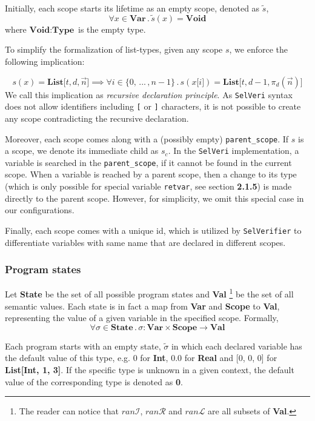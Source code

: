 \documentclass{article}
\begin{document}
Initially, each scope starts its lifetime as an empty scope, denoted as $\tilde{s}$, 
\[
\forall x \in \textbf{Var} \, . \,\tilde{s}(x) = \textbf{Void}
\]
where $\textbf{Void} : \textbf{Type}$ is the empty type.

To simplify the formalization of list-types, given any scope $s$, we enforce the following implication:

\[
s(x) = \textbf{List[$t,d,\vec{n}$]}
\implies
\forall i \in \{0, \,...\, , n-1\} \,.\, s(x\texttt{[$i$]}) = \textbf{List[$t, d-1, \pi_d(\vec{n})$]}
\]
We call this implication as \textit{recursive declaration principle}. As \texttt{SelVeri} syntax does not allow identifiers including \texttt{[} or \texttt{]} characters, it is not possible to create any scope contradicting the recursive declaration.

Moreover, each scope comes along with a (possibly empty) \texttt{parent\_scope}. If $s$ is a scope, we denote its immediate child as $s_c$. In the \texttt{SelVeri} implementation, a variable is searched in the \texttt{parent\_scope}, if it cannot be found in the current scope. When a variable is reached by a parent scope, then a change to its type (which is only possible for special variable \texttt{retvar}, see section \textbf{2.1.5}) is made directly to the parent scope. However, for simplicity, we omit this special case in our configurations.

Finally, each scope comes with a unique id, which is utilized by \texttt{SelVerifier} to differentiate variables with same name that are declared in different scopes.

\subsubsection{Program states}

Let \textbf{State} be the set of all possible program states and \textbf{Val} \footnote{The reader can notice that $ran\mathcal{I}$, $ran\mathcal{R}$ and $ran\mathcal{L}$ are all subsets of \textbf{Val}.} be the set of all semantic values. Each state is in fact a map from \textbf{Var} and \textbf{Scope} to \textbf{Val}, representing the value of a given variable in the specified scope. Formally,
\[
\forall \sigma \in \textbf{State} \, . \, \sigma: \textbf{Var} \times \textbf{Scope} \rightarrow \textbf{Val}
\]

Each program starts with an empty state, $\tilde{\sigma}$ in which each declared variable has the default value of this type, e.g. 0 for \textbf{Int}, 0.0 for \textbf{Real} and  [0, 0, 0] for \textbf{List[Int, 1, 3]}. If the specific type is unknown in a given context, the default value of the corresponding type is denoted as \textbf{0}.
\end{document}
